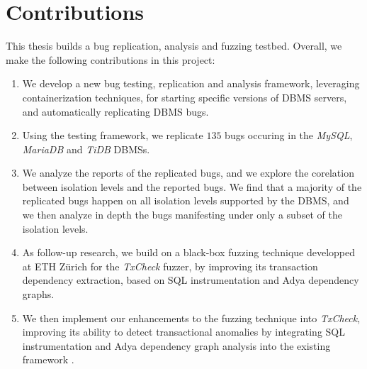 

\section{Contributions}

This thesis builds a bug replication, analysis and fuzzing testbed. Overall, we make the following contributions in this project:

\begin{enumerate}
    \item We develop a new bug testing, replication and analysis framework, leveraging containerization techniques, for starting specific versions of DBMS servers, and automatically replicating DBMS bugs.
    \item Using the testing framework, we replicate $135$ bugs occuring in the \textit{MySQL}, \textit{MariaDB} and \textit{TiDB} DBMSs.
    \item We analyze the reports of the replicated bugs, and we explore the corelation between isolation levels and the reported bugs. We find that a majority of the replicated bugs happen on all isolation levels supported by the DBMS, and we then analyze in depth the bugs manifesting under only a subset of the isolation levels.
    \item As follow-up research, we build on a black-box fuzzing technique developped at ETH Z\" urich for the \textit{TxCheck} fuzzer, by improving its transaction dependency extraction, based on SQL instrumentation and Adya dependency graphs.
    \item We then implement our enhancements to the fuzzing technique into \textit{TxCheck}, improving its ability to detect transactional anomalies by integrating SQL instrumentation and Adya dependency graph analysis into the existing framework \cite{jiang2023detecting}.
\end{enumerate}
